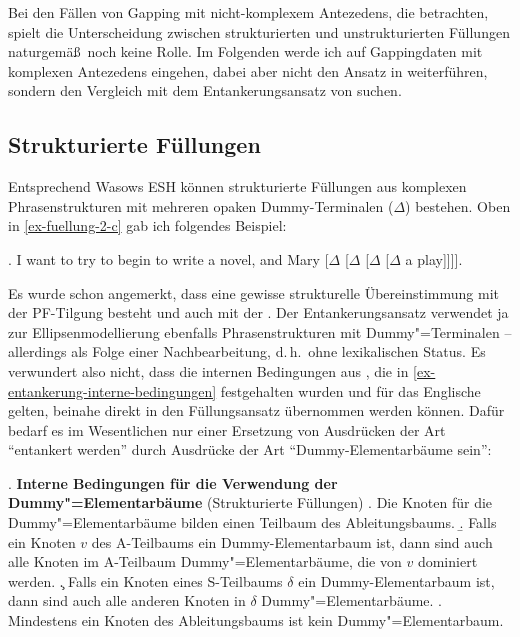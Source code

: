 Bei den Fällen von Gapping mit nicht-komplexem Antezedens, die \cite{Seddah:Sagot:06} betrachten, spielt die Unterscheidung zwischen strukturierten und unstrukturierten Füllungen naturgemä\ss\ noch keine Rolle. Im Folgenden werde ich auf Gappingdaten mit komplexen Antezedens eingehen, dabei aber nicht den Ansatz in \cite{Seddah:Sagot:06} weiterführen, sondern den Vergleich mit dem Entankerungsansatz von \cite{Lichte:Kallmeyer:10} suchen.
 

\subsection{Strukturierte Füllungen}  

Entsprechend Wasows ESH können strukturierte Füllungen aus komplexen Phrasenstrukturen mit mehreren opaken Dummy-Terminalen ($\Delta$) bestehen. Oben in \ref{ex-fuellung-2-c} gab ich folgendes Beispiel:

\ex. I want to try to begin to write a novel, and Mary [$\Delta$ [$\Delta$ [$\Delta$ [$\Delta$  a play]]]].\label{ex-fuellung-2-c-wdh}  

Es wurde schon angemerkt, dass eine gewisse strukturelle Übereinstimmung mit der PF-Til\-gung besteht \citep[6]{Winkler:Schwabe:03} und auch mit der . Der Entankerungsansatz verwendet ja zur Ellipsenmodellierung ebenfalls Phrasenstrukturen mit Dummy"=Terminalen -- allerdings als Folge einer Nachbearbeitung, d.\,h.\ ohne lexikalischen Status. Es verwundert also nicht, dass die internen Bedingungen aus \cite{Lichte:Kallmeyer:10}, die in \ref{ex-entankerung-interne-bedingungen} festgehalten wurden und für das Englische gelten, beinahe direkt in den Füllungsansatz übernommen werden können. Dafür bedarf es im Wesentlichen nur einer Ersetzung von Ausdrücken der Art "`entankert werden"' durch Ausdrücke der Art "`Dummy-Elementarbäume sein"':     

\ex. {\bf Interne Bedingungen für die Verwendung der Dummy"=Elementarbäume} (Strukturierte Füllungen) \label{ex-fuellung-interne-bedingungen-1}
\a. Die Knoten für die Dummy"=Elementarbäume bilden einen Teilbaum des Ableitungsbaums.
\b. Falls ein Knoten $v$ des A-Teilbaums ein Dummy-Elementarbaum ist, dann sind auch alle Knoten im A-Teilbaum Dummy"=Elementarbäume, die von $v$ dominiert werden.
\c. Falls ein Knoten eines S-Teilbaums $\delta$ ein Dummy-Elementarbaum ist, dann sind auch alle anderen Knoten in $\delta$ Dummy"=Elementarbäume.
\e. Mindestens ein Knoten des Ableitungsbaums ist kein Dummy"=Elementarbaum.

